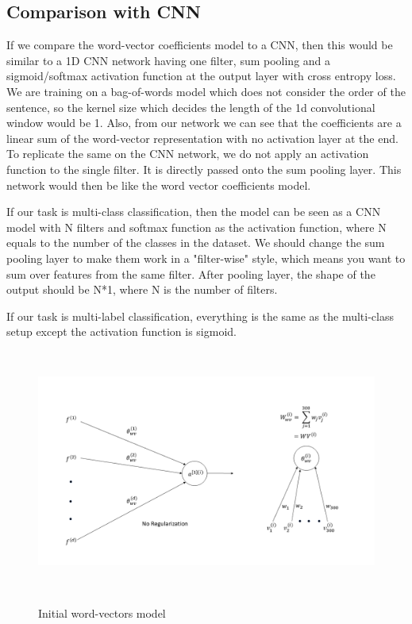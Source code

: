 \subsection{Comparison with CNN}

If we compare the word-vector coefficients model to a CNN, then this would be similar to a 1D CNN network having one filter, sum pooling and a sigmoid/softmax activation function at the output layer with cross entropy loss. We are training on a bag-of-words model which does not consider the order of the sentence, so the kernel size which decides the length of the 1d convolutional window would be 1. Also, from our network we can see that the coefficients are a linear sum of the word-vector representation with no activation layer at the end. To replicate the same on the CNN network, we do not apply an activation function to the single filter. It is directly passed onto the sum pooling layer. This network would then be like the word vector coefficients model.

If our task is multi-class classification, then the model can be seen as a CNN model with N filters and softmax function as the activation function, where N equals to the number of the classes in the dataset. We should change the sum pooling layer to make them work in a "filter-wise" style, which means you want to sum over features from the same filter. After pooling layer, the shape of the output should be N*1, where N is the number of filters.

If our task is multi-label classification, everything is the same as the multi-class setup except the activation function is sigmoid.

\begin{figure}[htbp]
\centering
\includegraphics[width=16cm, height=8cm]{images/init-wv.png}\\
\centering
\caption{Initial word-vectors model}
\label{fig:foo}
\end{figure}


